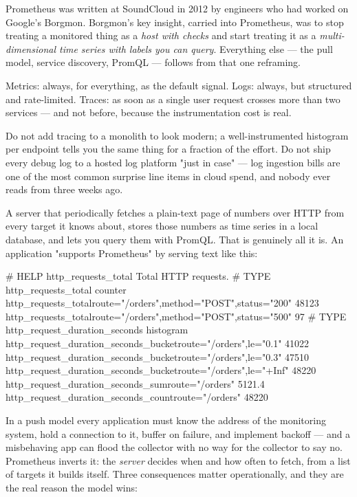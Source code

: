 \begin{whyexists}
Prometheus was written at SoundCloud in 2012 by engineers who had worked on Google's Borgmon. Borgmon's key insight, carried into Prometheus, was to stop treating a monitored thing as a \emph{host with checks} and start treating it as a \emph{multi-dimensional time series with labels you can query}. Everything else --- the pull model, service discovery, PromQL --- follows from that one reframing.
\end{whyexists}

 Metrics: always, for everything, as the default signal. Logs: always, but structured and rate-limited. Traces: as soon as a single user request crosses more than two services --- and not before, because the instrumentation cost is real.

 Do not add tracing to a monolith to look modern; a well-instrumented histogram per endpoint tells you the same thing for a fraction of the effort. Do not ship every debug log to a hosted log platform "just in case" --- log ingestion bills are one of the most common surprise line items in cloud spend, and nobody ever reads  from three weeks ago.


 A server that periodically fetches a plain-text page of numbers over HTTP from every target it knows about, stores those numbers as time series in a local database, and lets you query them with PromQL. That is genuinely all it is. An application "supports Prometheus" by serving text like this:

\begin{outbox}
# HELP http_requests_total Total HTTP requests.
# TYPE http_requests_total counter
http_requests_total{route="/orders",method="POST",status="200"} 48123
http_requests_total{route="/orders",method="POST",status="500"} 97
# TYPE http_request_duration_seconds histogram
http_request_duration_seconds_bucket{route="/orders",le="0.1"} 41022
http_request_duration_seconds_bucket{route="/orders",le="0.3"} 47510
http_request_duration_seconds_bucket{route="/orders",le="+Inf"} 48220
http_request_duration_seconds_sum{route="/orders"} 5121.4
http_request_duration_seconds_count{route="/orders"} 48220
\end{outbox}

 In a push model every application must know the address of the monitoring system, hold a connection to it, buffer on failure, and implement backoff --- and a misbehaving app can flood the collector with no way for the collector to say no. Prometheus inverts it: the \emph{server} decides when and how often to fetch, from a list of targets it builds itself. Three consequences matter operationally, and they are the real reason the model wins:

